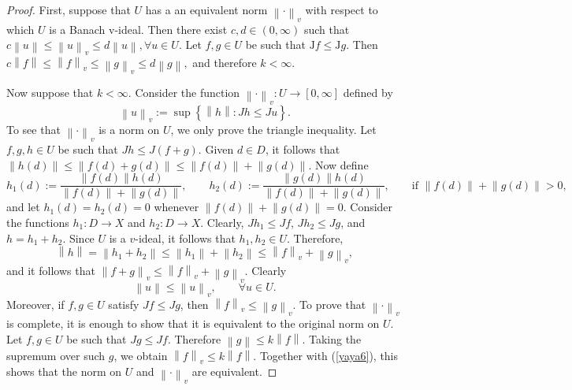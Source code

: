 \documentclass[14pt, a4paper]{article}  %
\providecommand{\llave}[1]{\left\lbrace #1\right\rbrace }
\providecommand{\pare}[1]{\left( #1\right) }
\providecommand{\norm}[1]{\left\lVert#1\right\rVert}
\newcommand{\tien}{\rightarrow}
\newcommand{\J}{\mathrm{J}}
\begin{document}
 \begin{proof}
First, suppose that $U$ has a an equivalent norm   $\norm{\cdot}_{v}$ with respect to which $U$ is a Banach v-ideal. Then there exist $c,d\in(0,\infty)$ such that
$
c\norm{u}\leq \norm{u}_{v}\leq d\norm{u},  \forall u\in U.
$
Let $f,g\in U$ be such that $\J f\leq \J g$. Then
$
c\norm{f}\leq \norm{f}_{v}\leq \norm{g}_{v}\leq d\norm{g},
$
and therefore
$
k <\infty.
$ 

Now suppose that $k<\infty$. Consider the function $\norm{\cdot}_{v}:U\tien[0,\infty]$ defined by
\begin{equation}
	\norm{u}_{v}:=\sup\llave{\norm{h}:Jh\leq Ju}.
\end{equation}
To see that $\norm{\cdot}_{v}$ is a norm on $U$, we only prove the triangle inequality. Let $f,g,h\in U$ be such that $Jh\leq J\pare{f+g}$.
Given $d\in D$, it follows that
$
\norm{h\pare{d}}
\leq
\norm{f\pare{d}+g\pare{d}}
\leq
\norm{f\pare{d}}+\norm{g\pare{d}}.
$
Now define
\begin{equation}
	h_{1}\pare{d}:=
	\frac{\norm{f\pare{d}}h\pare{d}}{\norm{f\pare{d}}+\norm{g\pare{d}}},
	\qquad
	h_{2}\pare{d}:=
	\frac{\norm{g\pare{d}}h\pare{d}}{\norm{f\pare{d}}+\norm{g\pare{d}}},
	\qquad
	\text{if }\norm{f\pare{d}}+\norm{g\pare{d}}>0,
\end{equation}
and let $h_{1}(d)=h_{2}(d)=0$ whenever
$
\norm{f\pare{d}}+\norm{g\pare{d}}=0.
$
Consider the functions $h_{1}:D\tien X$ and $h_{2}:D\tien X$. Clearly, $Jh_{1}\leq Jf$, $Jh_{2}\leq Jg$, and $h=h_{1}+h_{2}$. Since $U$ is a $v$-ideal, it follows that $h_{1}, h_{2}\in U$. Therefore,
\begin{equation}
	\norm{h}=\norm{h_{1}+h_{2}}\leq \norm{h_{1}}+\norm{h_{2}}\leq \norm{f}_{v}+\norm{g}_{v},
\end{equation}
and it follows that 
$
\norm{f+g}_{v}\leq \norm{f}_{v}+\norm{g}_{v}.
$
Clearly
\begin{equation}\label{yaya6}
	\norm{u}\leq \norm{u}_{v},\qquad \forall u\in U.
\end{equation}
Moreover, if $f,g\in U$ satisfy $Jf\leq Jg$, then $\norm{f}_{v}\leq \norm{g}_{v}$. To prove that $\norm{\cdot}_{v}$ is complete, it is enough to show that it is equivalent to the original norm on $U$. 
Let $f,g\in U$ be such that $Jg\leq Jf$. Therefore
$
\norm{g}\leq k\norm{f}.
$
Taking the supremum over such  $g$, we obtain
$
\norm{f}_{v}\leq k\norm{f}.
$
Together with (\ref{yaya6}), this shows that the norm on $U$ and $\norm{\cdot}_{v}$ are equivalent.
 \end{proof}
 
\end{document}
